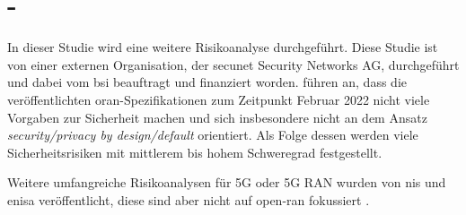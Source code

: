 \section{ - \citeauthor{kopsellOpenRANRisikoanalyse2022}}
\label{sec:forschungsstand-bsi}
In dieser Studie wird eine weitere Risikoanalyse durchgeführt. Diese Studie ist von einer externen Organisation, der secunet Security Networks AG, durchgeführt und dabei vom \gls{bsi} beauftragt und finanziert worden. \citeauthor{kopsellOpenRANRisikoanalyse2022} führen an, dass die veröffentlichten \gls{oran}-Spezifikationen zum Zeitpunkt Februar 2022 nicht viele Vorgaben zur Sicherheit machen und sich insbesondere nicht an dem Ansatz \textit{security/privacy by design/default} orientiert. Als Folge dessen werden viele Sicherheitsrisiken mit mittlerem bis hohem Schweregrad festgestellt. 
\par Weitere umfangreiche Risikoanalysen für 5G oder 5G RAN wurden von \gls{nis} und \gls{enisa} veröffentlicht, diese sind aber nicht auf \gls{open-ran} fokussiert \autocite{europeanunionagencyfornetworkandinformationsecurity.ENISAThreatLandscape2019} \autocite{EUCoordinatedRisk}.
%
